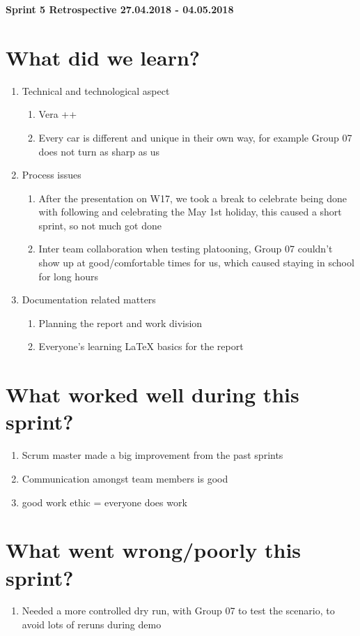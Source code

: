 \documentclass[11pt]{article}
\begin{document}
\centerline{\textbf{\LARGE Sprint 5 Retrospective 27.04.2018 - 04.05.2018}}

\section*{What did we learn?}
\begin{enumerate}
	\item Technical and technological aspect
		\begin{enumerate} 
			\item Vera ++
			\item Every car is different and unique in their own way, for example Group 07 does not turn as sharp as us
		\end{enumerate} 
	\item Process issues
		\begin{enumerate} 
			\item After the presentation on W17, we took a break to celebrate being done with following and celebrating the May 1st holiday, this caused a short sprint, so not much got done
			\item Inter team collaboration when testing platooning, Group 07 couldn’t show up at good/comfortable times for us, which caused staying in school for long hours
		\end{enumerate}		
	\item Documentation related matters
		\begin{enumerate} 
			\item Planning the report and work division
			\item Everyone's learning LaTeX basics for the report
		\end{enumerate}	
\end{enumerate} 

\section*{What worked well during this sprint?}
\begin{enumerate}
	\item Scrum master made a big improvement from the past sprints
	\item Communication amongst team members is good
	\item good work ethic = everyone does work
\end{enumerate} 

\section*{What went wrong/poorly this sprint?}
\begin{enumerate}
	\item Needed a more controlled dry run, with Group 07 to test the scenario, to avoid lots of reruns during demo
\end{enumerate} 
\end{document}
